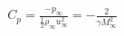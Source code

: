 \documentclass[10pt]{article}
\begin{document}
\begin{align*} C_{p}=\frac{-p_{\infty}}{\frac{1}{2} \rho_{\infty} u_{\infty}^{2} }
=- \frac{2}{\gamma M_{\infty}^{2}}\end{align*}
\end{document}

